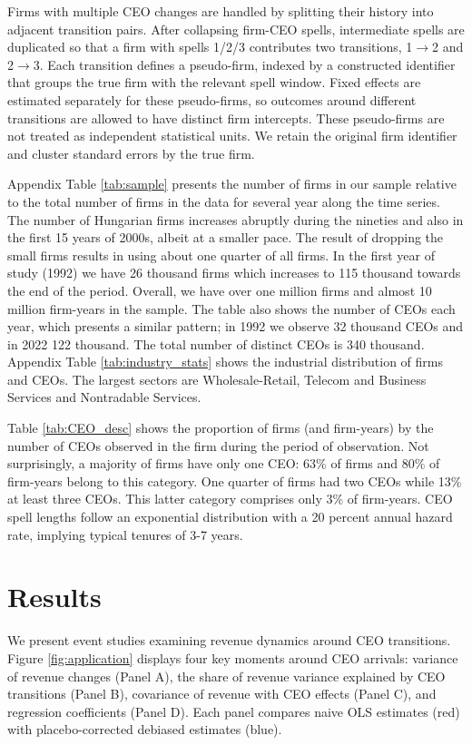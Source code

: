 \documentclass[11pt,a4paper]{article}
\begin{document}
Firms with multiple CEO changes are handled by splitting their history into adjacent transition pairs. After collapsing firm-CEO spells, intermediate spells are duplicated so that a firm with spells 1/2/3 contributes two transitions, 1$\to$2 and 2$\to$3. Each transition defines a pseudo-firm, indexed by a constructed identifier that groups the true firm with the relevant spell window. Fixed effects are estimated separately for these pseudo-firms, so outcomes around different transitions are allowed to have distinct firm intercepts. These pseudo-firms are not treated as independent statistical units. We retain the original firm identifier and cluster standard errors by the true firm. 

Appendix Table \ref{tab:sample} presents the number of firms in our sample relative to the total number of firms in the data for several year along the time series. The number of Hungarian firms increases abruptly during the nineties and also in the first 15 years of 2000s, albeit at a smaller pace.  The result of dropping the small firms results in using about one quarter of all firms. In the first year of study (1992) we have 26 thousand firms which increases to 115 thousand towards the end of the period. Overall, we have over one million firms and almost 10 million firm-years in the sample. The table also shows the number of CEOs each year, which presents a similar pattern; in 1992 we observe 32 thousand CEOs and in 2022 122 thousand. The total number of distinct CEOs is 340 thousand. Appendix Table \ref{tab:industry_stats} shows the industrial distribution of firms and CEOs. The largest sectors are Wholesale-Retail, Telecom and Business Services and Nontradable Services. 

Table \ref{tab:CEO_desc} shows the proportion of firms (and firm-years) by the number of CEOs observed in the firm during the period of observation. Not surprisingly, a majority of firms have only one CEO: 63\% of firms and 80\% of firm-years belong to this category. One quarter of firms had two CEOs while 13\% at least three CEOs. This latter category comprises only 3\% of firm-years. CEO spell lengths follow an exponential distribution with a 20 percent annual hazard rate, implying typical tenures of 3-7 years.


\section{Results}

We present event studies examining revenue dynamics around CEO transitions. Figure \ref{fig:application} displays four key moments around CEO arrivals: variance of revenue changes (Panel A), the share of revenue variance explained by CEO transitions (Panel B), covariance of revenue with CEO effects (Panel C), and regression coefficients (Panel D). Each panel compares naive OLS estimates (red) with placebo-corrected debiased estimates (blue).
\end{document}
